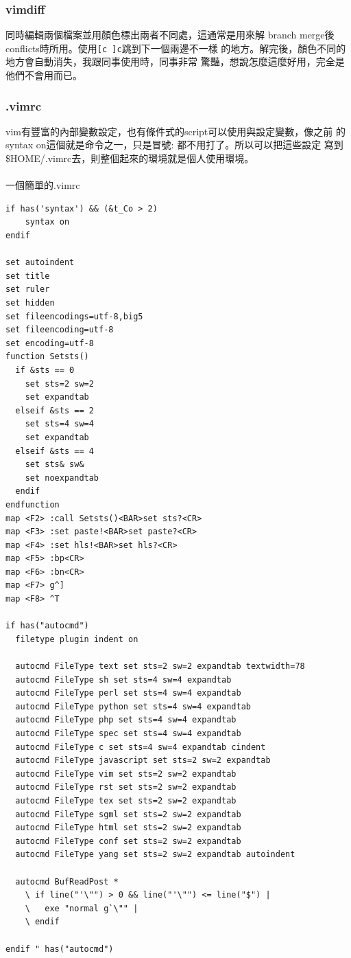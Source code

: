       \subsubsection{vimdiff}
        同時編輯兩個檔案並用顏色標出兩者不同處，這通常是用來解
        branch merge後conflicts時所用。使用\verb=[c ]c=跳到下一個兩邊不一樣
        的地方。解完後，顏色不同的地方會自動消失，我跟同事使用時，同事非常
        驚豔，想說怎麼這麼好用，完全是他們不會用而已。
      \subsubsection{.vimrc}
      vim有豐富的內部變數設定，也有條件式的script可以使用與設定變數，像之前
      的syntax on這個就是命令之一，只是冒號: 都不用打了。所以可以把這些設定
      寫到\$HOME/.vimrc去，則整個起來的環境就是個人使用環境。
      \\\\
      一個簡單的.vimrc
      \begin{verbatim}
if has('syntax') && (&t_Co > 2)
	syntax on
endif

set autoindent
set title
set ruler
set hidden
set fileencodings=utf-8,big5
set fileencoding=utf-8
set encoding=utf-8
function Setsts()
  if &sts == 0
    set sts=2 sw=2
    set expandtab
  elseif &sts == 2
    set sts=4 sw=4
    set expandtab
  elseif &sts == 4
    set sts& sw&
    set noexpandtab
  endif
endfunction
map <F2> :call Setsts()<BAR>set sts?<CR>
map <F3> :set paste!<BAR>set paste?<CR>
map <F4> :set hls!<BAR>set hls?<CR>
map <F5> :bp<CR>
map <F6> :bn<CR>
map <F7> g^]
map <F8> ^T

if has("autocmd")
  filetype plugin indent on

  autocmd FileType text set sts=2 sw=2 expandtab textwidth=78
  autocmd FileType sh set sts=4 sw=4 expandtab
  autocmd FileType perl set sts=4 sw=4 expandtab
  autocmd FileType python set sts=4 sw=4 expandtab
  autocmd FileType php set sts=4 sw=4 expandtab
  autocmd FileType spec set sts=4 sw=4 expandtab
  autocmd FileType c set sts=4 sw=4 expandtab cindent
  autocmd FileType javascript set sts=2 sw=2 expandtab
  autocmd FileType vim set sts=2 sw=2 expandtab
  autocmd FileType rst set sts=2 sw=2 expandtab
  autocmd FileType tex set sts=2 sw=2 expandtab
  autocmd FileType sgml set sts=2 sw=2 expandtab
  autocmd FileType html set sts=2 sw=2 expandtab
  autocmd FileType conf set sts=2 sw=2 expandtab
  autocmd FileType yang set sts=2 sw=2 expandtab autoindent

  autocmd BufReadPost *
    \ if line("'\"") > 0 && line("'\"") <= line("$") |
    \   exe "normal g`\"" |
    \ endif

endif " has("autocmd")
      \end{verbatim}
